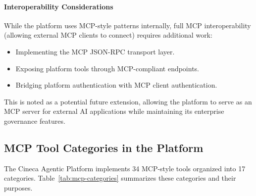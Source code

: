 \documentclass[a4paper,twoside]{sapthesis}
\begin{document}
\paragraph{Interoperability Considerations}

While the platform uses MCP-style patterns internally, full MCP interoperability (allowing external MCP clients to connect) requires additional work:
\begin{itemize}
    \item Implementing the MCP JSON-RPC transport layer.
    \item Exposing platform tools through MCP-compliant endpoints.
    \item Bridging platform authentication with MCP client authentication.
\end{itemize}

This is noted as a potential future extension, allowing the platform to serve as an MCP server for external AI applications while maintaining its enterprise governance features.

\subsection{MCP Tool Categories in the Platform}

The Cineca Agentic Platform implements 34 MCP-style tools organized into 17 categories. Table~\ref{tab:mcp-categories} summarizes these categories and their purposes.
\end{document}

